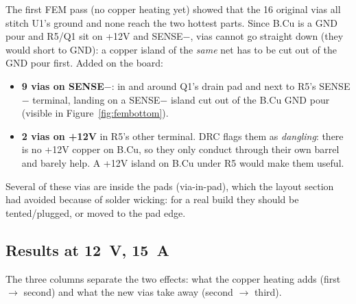 \documentclass[11pt,letterpaper]{article}
\begin{document}
The first FEM pass (no copper heating yet) showed that the 16 original vias all stitch U1's ground and none
reach the two hottest parts. Since B.Cu is a GND pour and R5/Q1 sit on +12V and SENSE$-$, vias cannot go
straight down (they would short to GND): a copper island of the \emph{same} net has to be cut out of the GND
pour first. Added on the board:
\begin{itemize}[nosep]
\item \textbf{9 vias on SENSE$-$}: in and around Q1's drain pad and next to R5's SENSE$-$ terminal, landing
on a SENSE$-$ island cut out of the B.Cu GND pour (visible in Figure~\ref{fig:fembottom}).
\item \textbf{2 vias on +12V} in R5's other terminal. DRC flags them as \emph{dangling}: there is no +12V
copper on B.Cu, so they only conduct through their own barrel and barely help. A +12V island on B.Cu under
R5 would make them useful.
\end{itemize}
Several of these vias are inside the pads (via-in-pad), which the layout section had avoided because of
solder wicking: for a real build they should be tented/plugged, or moved to the pad edge.

\subsection{Results at \SI{12}{\volt}, \SI{15}{\ampere}}

The three columns separate the two effects: what the copper heating adds (first $\to$ second) and what the
new vias take away (second $\to$ third).
\end{document}
